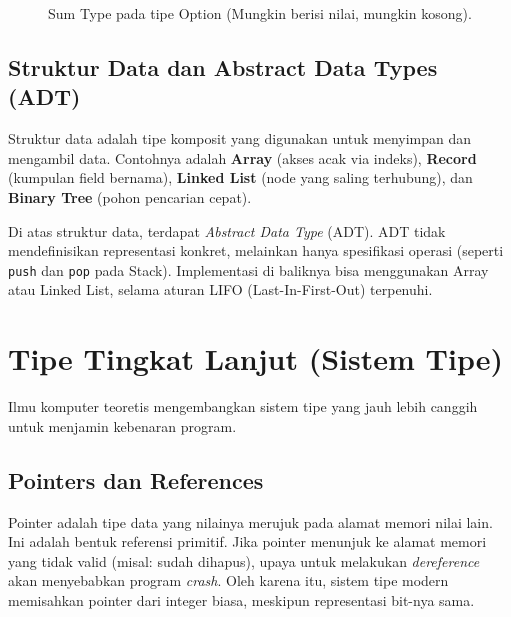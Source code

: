 \documentclass[11pt,a4paper]{article}
\begin{document}
	\begin{figure}[H]
		\centering
		\caption{Sum Type pada tipe Option (Mungkin berisi nilai, mungkin kosong).}
		\label{fig:sumtype}
	\end{figure}
	
	\subsection{Struktur Data dan Abstract Data Types (ADT)}
	Struktur data adalah tipe komposit yang digunakan untuk menyimpan dan mengambil data. Contohnya adalah \textbf{Array} (akses acak via indeks), \textbf{Record} (kumpulan field bernama), \textbf{Linked List} (node yang saling terhubung), dan \textbf{Binary Tree} (pohon pencarian cepat).
	
	Di atas struktur data, terdapat \textit{Abstract Data Type} (ADT). ADT tidak mendefinisikan representasi konkret, melainkan hanya spesifikasi operasi (seperti \texttt{push} dan \texttt{pop} pada Stack). Implementasi di baliknya bisa menggunakan Array atau Linked List, selama aturan LIFO (Last-In-First-Out) terpenuhi.
	
	\section{Tipe Tingkat Lanjut (Sistem Tipe)}
	
	Ilmu komputer teoretis mengembangkan sistem tipe yang jauh lebih canggih untuk menjamin kebenaran program.
	
	\subsection{Pointers dan References}
	Pointer adalah tipe data yang nilainya merujuk pada alamat memori nilai lain. Ini adalah bentuk referensi primitif. Jika pointer menunjuk ke alamat memori yang tidak valid (misal: sudah dihapus), upaya untuk melakukan \textit{dereference} akan menyebabkan program \textit{crash}. Oleh karena itu, sistem tipe modern memisahkan pointer dari integer biasa, meskipun representasi bit-nya sama.
	
\end{document}
